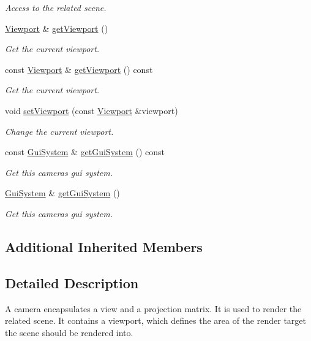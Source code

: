 \begin{DoxyCompactItemize}
\begin{DoxyCompactList}\small\item\em Access to the related scene. \end{DoxyCompactList}\item 
\mbox{\hyperlink{classec_1_1_viewport}{Viewport}} \& \mbox{\hyperlink{classec_1_1_camera_a1f2f4a745112c095d17480959a70eb16}{get\+Viewport}} ()
\begin{DoxyCompactList}\small\item\em Get the current viewport. \end{DoxyCompactList}\item 
const \mbox{\hyperlink{classec_1_1_viewport}{Viewport}} \& \mbox{\hyperlink{classec_1_1_camera_adb2920a7a634aadcaca579eaf3fc1ad0}{get\+Viewport}} () const
\begin{DoxyCompactList}\small\item\em Get the current viewport. \end{DoxyCompactList}\item 
void \mbox{\hyperlink{classec_1_1_camera_a3fc6f03041f6c0ee897c9596039d424d}{set\+Viewport}} (const \mbox{\hyperlink{classec_1_1_viewport}{Viewport}} \&viewport)
\begin{DoxyCompactList}\small\item\em Change the current viewport. \end{DoxyCompactList}\item 
const \mbox{\hyperlink{classec_1_1_gui_system}{Gui\+System}} \& \mbox{\hyperlink{classec_1_1_camera_a96f6414127f336eb9079ad30df80d1a7}{get\+Gui\+System}} () const
\begin{DoxyCompactList}\small\item\em Get this camera\textquotesingle{}s gui system. \end{DoxyCompactList}\item 
\mbox{\hyperlink{classec_1_1_gui_system}{Gui\+System}} \& \mbox{\hyperlink{classec_1_1_camera_a3af91683c492e0094127f169a4927945}{get\+Gui\+System}} ()
\begin{DoxyCompactList}\small\item\em Get this camera\textquotesingle{}s gui system. \end{DoxyCompactList}\end{DoxyCompactItemize}
\subsection*{Additional Inherited Members}


\subsection{Detailed Description}
A camera encapsulates a view and a projection matrix. It is used to render the related scene. It contains a viewport, which defines the area of the render target the scene should be rendered into. 

